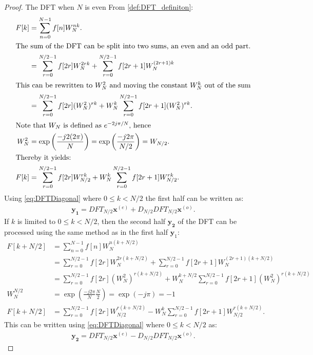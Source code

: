 \begin{proof}{The DFT when $N$ is even}
From \autoref{def:DFT_definiton}:
    \begin{align*}
         F[k]&=\sum^{N-1}_{n=0}f[n]W_N^{nk}.\\
        \intertext{The sum of the DFT can be split into two sums, an even and an odd part.}
        &=\sum^{N/2-1}_{r=0}f[2r]W_N^{2rk}+\sum^{N/2-1}_{r=0}f[2r+1]W_N^{(2r+1)k}\\
        \intertext{This can be rewritten to $W_N^2$ and moving the constant $W_N^k$ out of the sum}
        &=\sum^{N/2-1}_{r=0}f[2r](W_N^2)^{rk}+W_N^k\sum^{N/2-1}_{r=0}f[2r+1](W_N^2)^{rk}.\\
        \intertext{Note that $W_N$ is defined as $e^{-2j\pi/N}$, hence}
        W_N^2 &= \exp\left(\frac{-j2(2\pi)}{N}\right) = \exp\left(\frac{-j2\pi}{N/2}\right) = W_{N/2}.\\
        \intertext{Thereby it yields:}
        F[k] &= \sum^{N/2-1}_{r=0}f[2r]W^{rk}_{N/2}+W^k_N\sum^{N/2-1}_{r=0}f[2r+1]W^{rk}_{N/2}.
    \end{align*}
    Using \eqref{eq:DFTDiagonal} where $0 \leq k < N/2$ the first half can be written as:
     \begin{align*}
        \mathbf{y_1}=DFT_{N/2}\mathbf{x}^{(e)}+D_{N/2}DFT_{N/2}\mathbf{x}^{(o)}.
     \end{align*}
    If $k$ is limited to $0 \leq k < N/2$, then the second half $\mathbf{y_2}$ of the DFT can be processed using the same method as in the first half $\mathbf{y}_1$:
    \begin{align*}
        F[k+N/2] &= \sum^{N-1}_{n=0}f[n]W_N^{n(k+N/2)}\\
        &=\sum^{N/2-1}_{r=0}f[2r]W_N^{2r(k+N/2)}+\sum^{N/2-1}_{r=0}f[2r+1]W_N^{(2r+1)(k+N/2)}\\
        &=\sum^{N/2-1}_{r=0}f[2r](W_N^2)^{r(k+N/2)}+W_N^{k+N/2}\sum^{N/2-1}_{r=0}f[2r+1](W_N^2)^{r(k+N/2)}\\
        W_N^{N/2}&=\exp\left(\frac{-j2\pi}{N}\frac{N}{2}\right)=\exp\left(-j\pi\right)=-1\\
        F[k+N/2] &=\sum^{N/2-1}_{r=0}f[2r]W_{N/2}^{r(k+N/2)}-W_N^{k}\sum^{N/2-1}_{r=0}f[2r+1]W_{N/2}^{r(k+N/2)}.
    \end{align*}
    This can be written using \eqref{eq:DFTDiagonal} where $0 \leq k < N/2$ as:
    \begin{align*}
        \mathbf{y_2}=DFT_{N/2}\mathbf{x}^{(e)}-D_{N/2}DFT_{N/2}\mathbf{x}^{(o)}.
     \end{align*}
     \cite[67]{ryan2019linear}
\end{proof}
